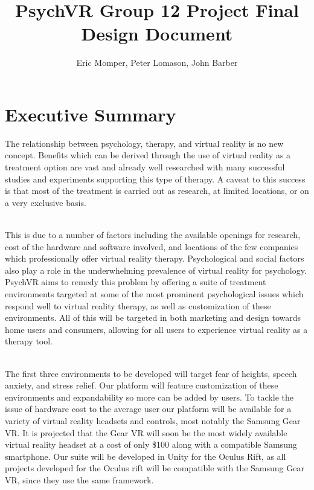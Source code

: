 \documentclass[a4paper,10pt]{article}
\title{PsychVR Group 12 Project Final Design Document}
\author{Eric Momper, Peter Lomason, John Barber}
\begin{document}
	
\maketitle
	
	\pagebreak
	\tableofcontents
	\pagebreak
{}	
\section{Executive Summary}
The relationship between psychology, therapy, and virtual reality is no new concept. Benefits which can be derived through the use of virtual reality as a treatment option are vast 
and already well researched with many successful studies and experiments supporting this type of therapy. A caveat to this success is that most of the treatment is carried out as research, 
at limited locations, or on a very exclusive basis.
\par~\\ 
This is due to a number of factors including the available openings for research, cost of the hardware and software involved, and locations of the few companies which professionally offer virtual reality therapy. Psychological and social factors also play a role in the underwhelming prevalence of virtual reality for psychology.  PsychVR aims to remedy this problem by offering a suite of treatment environments targeted at some of the most prominent psychological issues which respond well to virtual reality therapy, as well as customization of these environments.  All of this will be targeted in both marketing and design towards home users and consumers, allowing for all users to experience virtual reality as a therapy tool.
\par ~\\
The first three environments to be developed will target fear of heights, speech anxiety, and stress relief. Our platform will feature customization of these environments and expandability so more can be added by users.  To tackle the issue of hardware cost to the average user our platform will be available for a variety of virtual reality headsets and controls, most notably the Samsung Gear VR. It is projected that the Gear VR will soon be the most widely available virtual reality headset at a cost of only \$100 along with a compatible Samsung smartphone. Our suite will be developed in Unity for the Oculus Rift, as all projects developed for the Oculus rift will be compatible with the Samsung Gear VR, since they use the same framework.
\par ~\\
\end{document}
